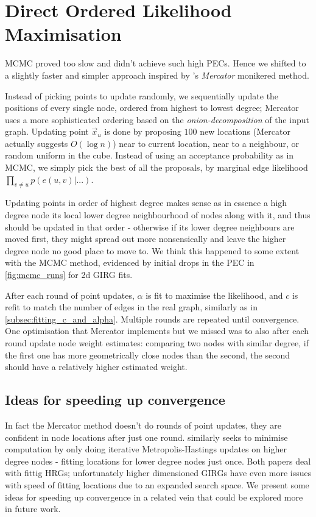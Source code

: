 \section{Direct Ordered Likelihood Maximisation}
\label{sec:direct_ordered_likelihood_maximisation}
MCMC proved too slow and didn't achieve such high PECs. Hence we shifted to a slightly faster and simpler approach inspired by \cite{garcia2019mercator}'s  \textit{Mercator} monikered method.

Instead of picking points to update randomly, we sequentially update the positions of every single node, ordered from highest to lowest degree; Mercator uses a more sophisticated ordering based on the \textit{onion-decomposition} of the input graph. Updating point $\vec{x}_u$ is done by proposing $100$ new locations (Mercator actually suggests $O(\log n)$) near to current location, near to a neighbour, or random uniform in the cube. Instead of using an acceptance probability as in MCMC, we simply pick the best of all the proposals, by marginal edge likelihood $\prod_{v \neq u} p(e(u,v) | ...)$.

Updating points in order of highest degree makes sense as in essence a high degree node  its local lower degree neighbourhood of nodes along with it, and thus should be updated in that order - otherwise if its lower degree neighbours are moved first, they might spread out more nonsensically and leave the higher degree node no good place to move to. We think this happened to some extent with the MCMC method, evidenced by initial drops in the PEC in \cref{fig:mcmc_runs} for 2d GIRG fits.

After each round of point updates, $\alpha$ is fit to maximise the likelihood, and $c$ is refit to match the number of edges in the real graph, similarly as in \cref{subsec:fitting_c_and_alpha}. Multiple rounds are repeated until convergence. One optimisation that Mercator implements but we missed was to also after each round update node weight estimates: comparing two nodes with similar degree, if the first one has more geometrically close nodes than the second, the second should have a relatively higher estimated weight.



\subsection{Ideas for speeding up convergence}
In fact the Mercator method doesn't do rounds of point updates, they are confident in node locations after just one round. \cite{boguna2010sustaining} similarly seeks to minimise computation by only doing iterative Metropolis-Hastings updates on higher degree nodes - fitting locations for lower degree nodes just once. Both papers deal with fittig HRGs; unfortunately higher dimensioned GIRGs have even more issues with speed of fitting locations due to an expanded search space. We present some ideas for speeding up convergence in a related vein that could be explored more in future work.


